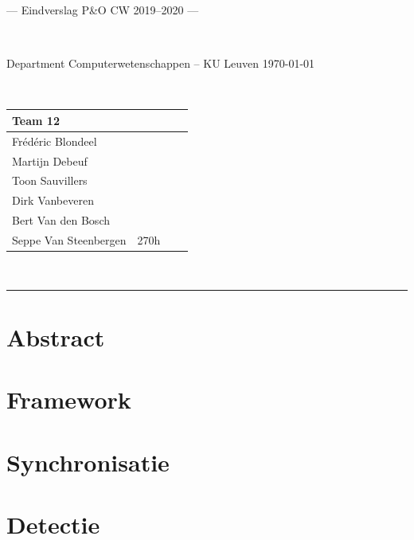 \documentclass[a4paper,11pt]{article}
\begin{document}
\newcommand{\note}[1]{{\colorbox{yellow!40!white}{#1}}}
\newcommand{\exampletext}[1]{{\color{blue!60!black}#1}}

\noindent
\colorbox[HTML]{52BDEC}{\bfseries\parbox{\textwidth}{\centering\large
--- Eindverslag P\&O CW 2019--2020 ---
}}
\\[-1mm]
\colorbox[HTML]{00407A}{\bfseries\color{white}\parbox{\textwidth}{
Department Computerwetenschappen -- KU Leuven
\hfill
\today
}}
\\

\smallskip

\noindent

\begin{tabular}{*4l}
\toprule
\multicolumn{2}{l}{\large\textbf{Team 12}} \\
\midrule
Frédéric Blondeel &\\
Martijn Debeuf &\\
Toon Sauvillers &\\ %
Dirk Vanbeveren  &\\
Bert Van den Bosch & \\
Seppe Van Steenbergen & 270h\\


\bottomrule
\hline
\end{tabular}\\
\smallskip

\noindent
{\color[HTML]{52BDEC} \rule{\linewidth}{1mm} }


\section*{Abstract}\label{sec:abstract}

\newpage

\tableofcontents
\newpage



\section{Framework}\label{sec:framework}


\section{Synchronisatie}\label{sec:synchronisatie}




\section{Detectie}\label{sec:detectie}

\end{document}
